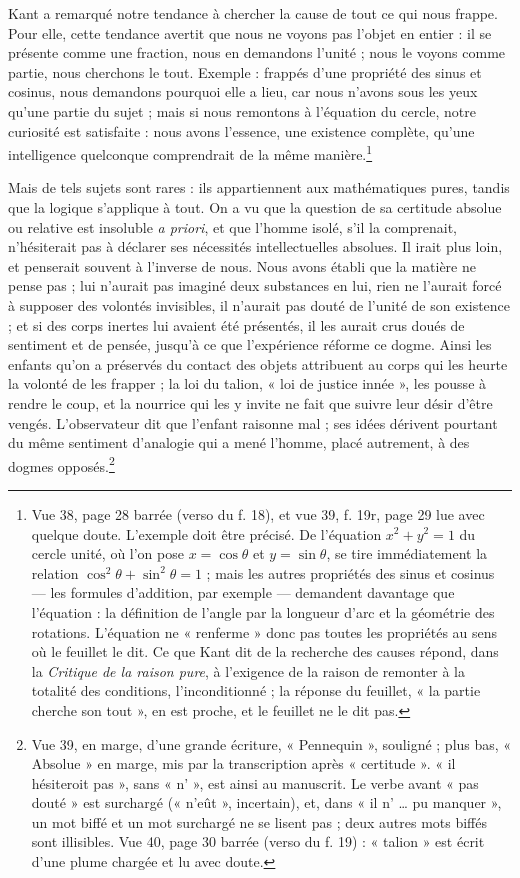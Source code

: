 \documentclass[11pt,a4paper]{article}
\begin{document}
Kant a remarqué notre tendance à chercher la cause de tout ce qui nous frappe.
Pour elle, cette tendance avertit que nous ne voyons pas l'objet en entier : il
se présente comme une fraction, nous en demandons l'unité ; nous le voyons comme
partie, nous cherchons le tout. Exemple : frappés d'une propriété des sinus et
cosinus, nous demandons pourquoi elle a lieu, car nous n'avons sous les yeux
qu'une partie du sujet ; mais si nous remontons à l'équation du cercle, notre
curiosité est satisfaite : nous avons l'essence, une existence complète, qu'une
intelligence quelconque comprendrait de la même manière.\footnote{Vue 38, page
28 barrée (verso du f. 18), et vue 39, f. 19r, page 29 lue avec quelque doute.
L'exemple doit être précisé. De l'équation $x^2 + y^2 = 1$ du cercle unité, où
l'on pose $x = \cos\theta$ et $y = \sin\theta$, se tire immédiatement la
relation $\cos^2\theta + \sin^2\theta = 1$ ; mais les autres propriétés des
sinus et cosinus — les formules d'addition, par exemple — demandent davantage
que l'équation : la définition de l'angle par la longueur d'arc et la
géométrie des rotations. L'équation ne « renferme » donc pas toutes les
propriétés au sens où le feuillet le dit. Ce que Kant dit de la recherche des
causes répond, dans la \emph{Critique de la raison pure}, à l'exigence de la
raison de remonter à la totalité des conditions, l'inconditionné ; la
réponse du feuillet, « la partie cherche son tout », en est proche, et le
feuillet ne le dit pas.}

Mais de tels sujets sont rares : ils appartiennent aux mathématiques pures,
tandis que la logique s'applique à tout. On a vu que la question de sa
certitude absolue ou relative est insoluble \emph{a priori}, et que l'homme
isolé, s'il la comprenait, n'hésiterait pas à déclarer ses nécessités
intellectuelles absolues. Il irait plus loin, et penserait souvent à l'inverse
de nous. Nous avons établi que la matière ne pense pas ; lui n'aurait pas imaginé
deux substances en lui, rien ne l'aurait forcé à supposer des volontés
invisibles, il n'aurait pas douté de l'unité de son existence ; et si des corps
inertes lui avaient été présentés, il les aurait crus doués de sentiment et de
pensée, jusqu'à ce que l'expérience réforme ce dogme. Ainsi les enfants qu'on a
préservés du contact des objets attribuent au corps qui les heurte la volonté
de les frapper ; la loi du talion, « loi de justice innée », les pousse à
rendre le coup, et la nourrice qui les y invite ne fait que suivre leur désir
d'être vengés. L'observateur dit que l'enfant raisonne mal ; ses idées dérivent
pourtant du même sentiment d'analogie qui a mené l'homme, placé autrement, à des
dogmes opposés.\footnote{Vue 39, en marge, d'une grande écriture, « Pennequin »,
souligné ; plus bas, « Absolue » en marge, mis par la transcription après
« certitude ». « il hésiteroit pas », sans « n' », est ainsi au manuscrit. Le
verbe avant « pas douté » est surchargé (« n'eût », incertain), et, dans « il
n' … pu manquer », un mot biffé et un mot surchargé ne se lisent pas ;
deux autres mots biffés sont illisibles. Vue 40, page 30 barrée (verso du
f. 19) : « talion » est écrit d'une plume chargée et lu avec doute.}
\end{document}
